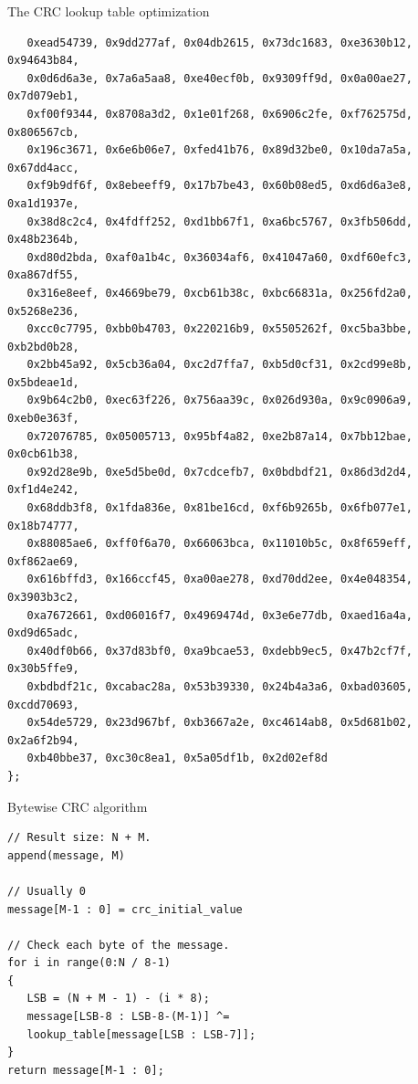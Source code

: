 \documentclass[10pt]{beamer}
\begin{document}
\begin{frame}[fragile]{The CRC lookup table optimization}   
\begin{scriptsize}
\begin{verbatim}
   0xead54739, 0x9dd277af, 0x04db2615, 0x73dc1683, 0xe3630b12, 0x94643b84,
   0x0d6d6a3e, 0x7a6a5aa8, 0xe40ecf0b, 0x9309ff9d, 0x0a00ae27, 0x7d079eb1,
   0xf00f9344, 0x8708a3d2, 0x1e01f268, 0x6906c2fe, 0xf762575d, 0x806567cb,
   0x196c3671, 0x6e6b06e7, 0xfed41b76, 0x89d32be0, 0x10da7a5a, 0x67dd4acc,
   0xf9b9df6f, 0x8ebeeff9, 0x17b7be43, 0x60b08ed5, 0xd6d6a3e8, 0xa1d1937e,
   0x38d8c2c4, 0x4fdff252, 0xd1bb67f1, 0xa6bc5767, 0x3fb506dd, 0x48b2364b,
   0xd80d2bda, 0xaf0a1b4c, 0x36034af6, 0x41047a60, 0xdf60efc3, 0xa867df55,
   0x316e8eef, 0x4669be79, 0xcb61b38c, 0xbc66831a, 0x256fd2a0, 0x5268e236,
   0xcc0c7795, 0xbb0b4703, 0x220216b9, 0x5505262f, 0xc5ba3bbe, 0xb2bd0b28,
   0x2bb45a92, 0x5cb36a04, 0xc2d7ffa7, 0xb5d0cf31, 0x2cd99e8b, 0x5bdeae1d,
   0x9b64c2b0, 0xec63f226, 0x756aa39c, 0x026d930a, 0x9c0906a9, 0xeb0e363f,
   0x72076785, 0x05005713, 0x95bf4a82, 0xe2b87a14, 0x7bb12bae, 0x0cb61b38,
   0x92d28e9b, 0xe5d5be0d, 0x7cdcefb7, 0x0bdbdf21, 0x86d3d2d4, 0xf1d4e242,
   0x68ddb3f8, 0x1fda836e, 0x81be16cd, 0xf6b9265b, 0x6fb077e1, 0x18b74777,
   0x88085ae6, 0xff0f6a70, 0x66063bca, 0x11010b5c, 0x8f659eff, 0xf862ae69,
   0x616bffd3, 0x166ccf45, 0xa00ae278, 0xd70dd2ee, 0x4e048354, 0x3903b3c2,
   0xa7672661, 0xd06016f7, 0x4969474d, 0x3e6e77db, 0xaed16a4a, 0xd9d65adc,
   0x40df0b66, 0x37d83bf0, 0xa9bcae53, 0xdebb9ec5, 0x47b2cf7f, 0x30b5ffe9,
   0xbdbdf21c, 0xcabac28a, 0x53b39330, 0x24b4a3a6, 0xbad03605, 0xcdd70693,
   0x54de5729, 0x23d967bf, 0xb3667a2e, 0xc4614ab8, 0x5d681b02, 0x2a6f2b94,
   0xb40bbe37, 0xc30c8ea1, 0x5a05df1b, 0x2d02ef8d
};
\end{verbatim}
\end{scriptsize}
\end{frame}


\begin{frame}[fragile]{Bytewise CRC algorithm}
\begin{verbatim}
// Result size: N + M.
append(message, M)

// Usually 0
message[M-1 : 0] = crc_initial_value

// Check each byte of the message.
for i in range(0:N / 8-1) 
{
   LSB = (N + M - 1) - (i * 8);
   message[LSB-8 : LSB-8-(M-1)] ^= 
   lookup_table[message[LSB : LSB-7]];
}
return message[M-1 : 0];
\end{verbatim}
\end{frame}
\end{document}
